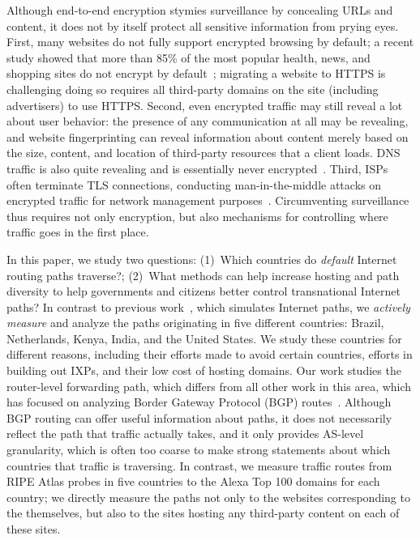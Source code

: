 Although end-to-end encryption stymies surveillance by
concealing URLs and content, it does not by itself protect all sensitive
information from prying eyes. First, many websites do not fully support
encrypted browsing by default; a recent study showed that more than 85\%
of the most popular health, news, and shopping sites do not encrypt by
default~\cite{what_isps_can_see}; migrating a website to HTTPS is
challenging doing so requires all third-party domains on the site
(including advertisers) to use HTTPS.  Second, even encrypted traffic
may still reveal a lot about user behavior: the presence of any
communication at all may be revealing, and website fingerprinting can
reveal information about content merely based on the size, content, and
location of third-party resources that a client loads. DNS traffic is
also quite revealing and is essentially never
encrypted~\cite{what_isps_can_see}.  Third, ISPs often terminate TLS
connections, conducting man-in-the-middle attacks on encrypted traffic
for network management purposes~\cite{mitm_isp}. Circumventing
surveillance thus requires not only encryption, but also mechanisms
for controlling where traffic goes in the first place.

In this paper, we study two questions: (1)~Which countries do {\em
  default} Internet routing paths traverse?; (2)~What methods can help
increase hosting and path diversity to help governments and citizens
better control transnational Internet paths?  In contrast to previous
work~\cite{karlin2009nation}, which simulates Internet paths, we
\textit{actively measure} and analyze the paths originating in five
different countries: Brazil, Netherlands, Kenya, India, and the United
States.  We study these countries for different reasons, including their
efforts made to avoid certain countries, efforts in building out IXPs,
and their low cost of hosting domains.  Our work studies the
router-level forwarding path, which differs from all other work in this
area, which has focused on analyzing Border Gateway Protocol
(BGP) routes~\cite{karlin2009nation,shah2015characterizing}.  Although
BGP routing can offer useful information about paths, it does not
necessarily reflect the path that traffic actually takes, and it only
provides AS-level granularity, which is often too coarse to make strong
statements about which countries that traffic is traversing.  In
contrast, we measure traffic routes from RIPE Atlas probes in five
countries to the Alexa Top 100 domains for each country; we directly
measure the paths not only to the websites corresponding to the
themselves, but also to the sites hosting any third-party content on
each of these sites.

